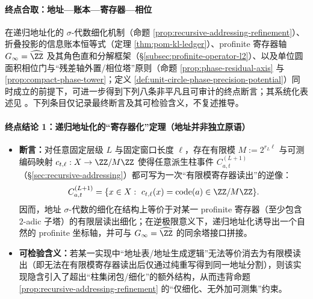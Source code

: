 \paragraph{终点合取：地址—账本—寄存器—相位}
在递归地址化的 \(\sigma\)-代数细化机制（命题 \ref{prop:recursive-addressing-refinement}）、折叠投影的信息账本恒等式（定理 \ref{thm:pom-kl-ledger}）、profinite 寄存器轴 \(G_\infty=\widehat{\ZZ}\) 及其角色直和分解框架（\S\ref{subsec:profinite-operator-l2}）、以及单位圆面积相位门与“残差轴外置/相位塔”原则（命题 \ref{prop:phase-residual-axis} 与 \ref{prop:compact-phase-tower}；定义 \ref{def:unit-circle-phase-precision-potential}）同时成立的前提下，可进一步得到下列八条非平凡且可审计的终点断言；其系统化表述见 \cite{Internal2026POMGenerativeAddressThreeRegisterBridgeRH}。下列条目仅记录最终断言及其可检验含义，不复述推导。

\paragraph{终点结论 1：递归地址化的“寄存器化”定理（地址并非独立原语）}
\begin{itemize}
  \item \textbf{断言：}对任意固定层级 \(L\) 与固定窗口长度 \(\ell\)，存在有限模 \(M:=2^{r_L\ell}\) 与可测编码映射 \(c_{t,\ell}:X\to \ZZ/M\ZZ\) 使得任意派生柱事件 \(C^{(L+1)}_{a,t}\)（\S\ref{sec:recursive-addressing}）都可写为一次“有限模寄存器读出”的逆像：
  \[
  C^{(L+1)}_{a,t}=\{x\in X:\ c_{t,\ell}(x)=\mathrm{code}(a)\in\ZZ/M\ZZ\}.
  \]
  因而，地址 \(\sigma\)-代数的细化在结构上等价于对某一 profinite 寄存器（至少包含 \(2\)-adic 子塔）的有限层读出细化；在逆极限意义下，递归地址化诱导出一个自然的 profinite 坐标轴，并可与 \(G_\infty=\widehat{\ZZ}\) 的同余塔接口拼接。
  \item \textbf{可检验含义：}若某一实现中“地址表/地址生成逻辑”无法等价消去为有限模读出（即无法在有限模寄存器读出后仅通过纯重写得到同一地址分割），则该实现隐含引入了超出“柱集闭包/细化”的额外结构，从而违背命题 \ref{prop:recursive-addressing-refinement} 的“仅细化、无外加可测集”约束。
\end{itemize}

